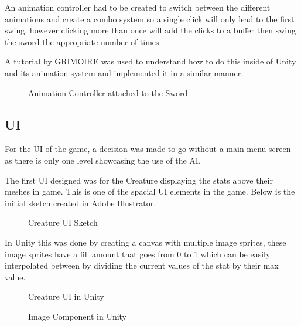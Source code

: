\documentclass[11pt]{report}
\begin{document}
An animation controller had to be created to switch between the different animations and create a combo system so a single click will only lead to the first swing, however clicking more than once will add the clicks to a buffer then swing the sword the appropriate number of times.

A tutorial by GRIMOIRE \cite{comboSystem} was used to understand how to do this inside of Unity and its animation system and implemented it in a similar manner.

\begin{figure}[H]
    \centering
    \caption{Animation Controller attached to the Sword}
\end{figure}


\subsection{UI}
For the UI of the game, a decision was made to go without a main menu screen as there is only one level showcasing the use of the AI. 

The first UI designed was for the Creature displaying the stats above their meshes in game. This is one of the spacial UI elements in the game. Below is the initial sketch created in Adobe Illustrator.

\begin{figure}[H]
    \centering
    \caption{Creature UI Sketch}
\end{figure}

In Unity this was done by creating a canvas with multiple image sprites, these image sprites have a fill amount that goes from 0 to 1 which can be easily interpolated between by dividing the current values of the stat by their max value.

\begin{figure}[H]
    \begin{minipage}{.5\textwidth}
        \centering
        \caption{Creature UI in Unity}
    \end{minipage}
    \begin{minipage}{.5\textwidth}
        \centering
        \caption{Image Component in Unity}
    \end{minipage}
\end{figure}
\end{document}
